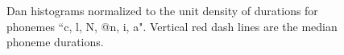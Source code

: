 \begin{figure}[ht!]
    \hfill
  
    \caption[]{Dan histograms normalized to the unit density of durations for phonemes ``c, l, N, @n, i, a". Vertical red dash lines are the median phoneme durations.}
    \label{fig:ch4:dan_histo_phoneme}
\end{figure}

